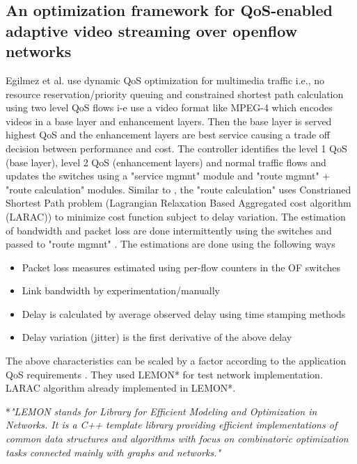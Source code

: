 \documentclass[paper=a4, fontsize=11pt]{scrartcl}	%
\numberwithin{equation}{section}		%
\numberwithin{figure}{section}			%
\numberwithin{table}{section}				%
\begin{document}
\subsection{An optimization framework for QoS-enabled adaptive video streaming over openflow networks}
Egilmez et al. use dynamic QoS optimization for multimedia traffic i.e., no resource reservation/priority queuing and constrained shortest path calculation using two level QoS flows i-e use a video format like MPEG-4 which encodes videos in a base layer and enhancement layers. Then the base layer is served highest QoS and the enhancement layers are best service causing a trade off decision between performance and cost. The controller identifies the level 1 QoS (base layer), level 2 QoS (enhancement layers) and normal traffic flows and updates the switches using a "service mgmnt" module and "route mgmnt" + "route calculation" modules. Similar to \cite{openqos}, the "route calculation" uses Constrianed Shortest Path problem (Lagrangian Relaxation Based Aggregated cost algorithm (LARAC)) to minimize cost function subject to delay variation. The estimation of bandwidth and packet loss are done intermittently using the switches and passed to "route mgmnt" \cite{video}. The estimations are done using the following ways
\begin{itemize}
	\item Packet loss measures estimated using per-flow counters in the OF switches
	\item Link bandwidth by experimentation/manually
	\item Delay is calculated by average observed delay using time stamping methods
	\item Delay variation (jitter) is the first derivative of the above delay
\end{itemize}
The above characteristics can be scaled by a factor according to the application QoS requirements \cite{video}. They used LEMON* for test network implementation. LARAC algorithm already implemented in LEMON*. 
\begin{center}
*\textit{"LEMON stands for Library for Efficient Modeling and Optimization in Networks. It is a C++ template library providing efficient implementations of common data structures and algorithms with focus on combinatoric optimization tasks connected mainly with graphs and networks." \cite{lemon}}
\end{center}
\end{document}
